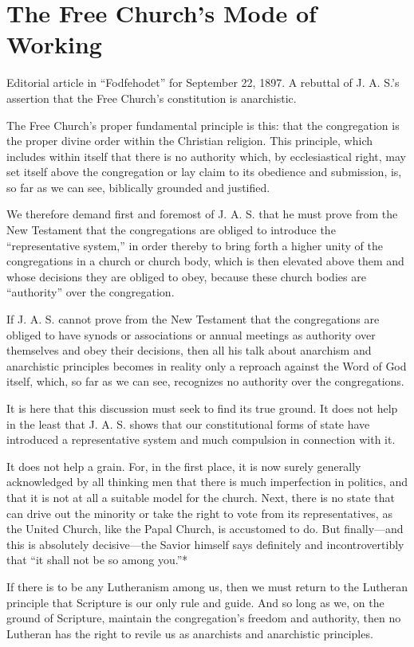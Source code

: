 
\section{The Free Church’s Mode of Working}

Editorial article in “Fodfehodet” for September 22, 1897.
A rebuttal of J. A. S.’s assertion that the Free Church’s constitution is anarchistic.

The Free Church’s proper fundamental principle is this: that the congregation is the proper divine order within the Christian religion. This principle, which includes within itself that there is no authority which, by ecclesiastical right, may set itself above the congregation or lay claim to its obedience and submission, is, so far as we can see, biblically grounded and justified.

We therefore demand first and foremost of J. A. S. that he must prove from the New Testament that the congregations are obliged to introduce the “representative system,” in order thereby to bring forth a higher unity of the congregations in a church or church body, which is then elevated above them and whose decisions they are obliged to obey, because these church bodies are “authority” over the congregation.

If J. A. S. cannot prove from the New Testament that the congregations are obliged to have synods or associations or annual meetings as authority over themselves and obey their decisions, then all his talk about anarchism and anarchistic principles becomes in reality only a reproach against the Word of God itself, which, so far as we can see, recognizes no authority over the congregations.

It is here that this discussion must seek to find its true ground. It does not help in the least that J. A. S. shows that our constitutional forms of state have introduced a representative system and much compulsion in connection with it.

It does not help a grain. For, in the first place, it is now surely generally acknowledged by all thinking men that there is much imperfection in politics, and that it is not at all a suitable model for the church. Next, there is no state that can drive out the minority or take the right to vote from its representatives, as the United Church, like the Papal Church, is accustomed to do. But finally—and this is absolutely decisive—the Savior himself says definitely and incontrovertibly that “it shall not be so among you.”*

If there is to be any Lutheranism among us, then we must return to the Lutheran principle that Scripture is our only rule and guide. And so long as we, on the ground of Scripture, maintain the congregation’s freedom and authority, then no Lutheran has the right to revile us as anarchists and anarchistic principles.

